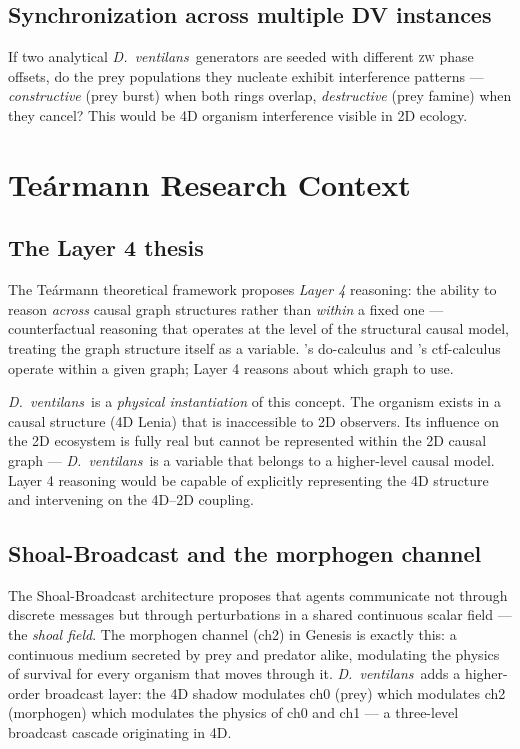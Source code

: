 \documentclass[11pt,a4paper]{article}
\newcommand{\spc}[1]{\textit{#1}}  %
\newcommand{\DV}{\spc{D.\ ventilans}}
\begin{document}
\subsection{Synchronization across multiple DV instances}
If two analytical \DV\ generators are seeded with different \textsc{zw}
phase offsets, do the prey populations they nucleate exhibit interference
patterns --- \emph{constructive} (prey burst) when both rings overlap,
\emph{destructive} (prey famine) when they cancel? This would be 4D
organism interference visible in 2D ecology.

\section{Teármann Research Context}

\subsection{The Layer 4 thesis}
The Teármann theoretical framework proposes \textit{Layer 4} reasoning:
the ability to reason \emph{across} causal graph structures rather than
\emph{within} a fixed one --- counterfactual reasoning that operates at
the level of the structural causal model, treating the graph structure
itself as a variable. \citet{pearl2009}'s do-calculus and
\citet{correa2020}'s ctf-calculus operate within a given graph; Layer 4
reasons about which graph to use.

\DV\ is a \emph{physical instantiation} of this concept. The organism
exists in a causal structure (4D Lenia) that is inaccessible to 2D
observers. Its influence on the 2D ecosystem is fully real but cannot be
represented within the 2D causal graph --- \DV\ is a variable that
belongs to a higher-level causal model. Layer 4 reasoning would be
capable of explicitly representing the 4D structure and intervening on
the 4D--2D coupling.

\subsection{Shoal-Broadcast and the morphogen channel}
The Shoal-Broadcast architecture proposes that agents communicate not
through discrete messages but through perturbations in a shared
continuous scalar field --- the \emph{shoal field}. The morphogen channel
(ch2) in Genesis is exactly this: a continuous medium secreted by prey
and predator alike, modulating the physics of survival for every organism
that moves through it. \DV\ adds a higher-order broadcast layer: the 4D
shadow modulates ch0 (prey) which modulates ch2 (morphogen) which
modulates the physics of ch0 and ch1 --- a three-level broadcast cascade
originating in 4D.
\end{document}
